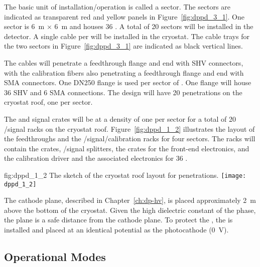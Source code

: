 The basic unit of installation/operation is called a sector. The sectors are indicated as transparent red and yellow panels in Figure~\ref{fig:dppd_3_1}. One \dual {} sector is \SI{6}{\m} $\times$ \SI{6}{\m} and houses \num{36} . A total of \num{20} sectors will be installed in the detector. A single  cable per  will be installed in the cryostat.
The cable trays for the two sectors in Figure~\ref{fig:dppd_3_1} are indicated as black vertical lines.


The  cables will penetrate a feedthrough flange and end with SHV connectors, with the calibration fibers also penetrating a feedthrough flange and end with SMA connectors. One DN250 flange is used per sector of \dual {}. One flange will house \num{36} SHV and \num{6} SMA connections. The \dual {} design will have \num{20} penetrations on the cryostat roof, one per sector. 

The  and signal crates will be at a density of one per sector for a total of \num{20} /signal racks on the cryostat roof. Figure~\ref{fig:dppd_1_2} illustrates the layout of the feedthroughs and the /signal/calibration racks for four sectors. The racks will contain the  crates, /signal splitters, the  crates for the front-end electronics, and the calibration  driver and the associated electronics for \num{36} .

\begin{dunefigure}{fig:dppd_1_2}
{The sketch of the cryostat roof layout for \dual {} penetrations.}
\texttt{[image: dppd\_1\_2]}
\end{dunefigure}

The cathode plane, described in Chapter~\ref{ch:dp-hv}, is placed approximately \SI{2}{m} above the bottom of the cryostat. Given the high dielectric constant of the  phase, the  plane is a safe distance from the cathode plane. To protect the , the  is installed and placed at an identical potential as the  photocathode (\SI{0}{V}).

\subsection{Operational Modes} %
\label{sec:dp-pds-oveerview_operation}

